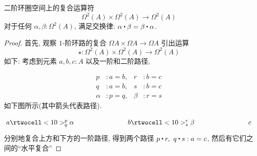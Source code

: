 \begin{thm}
    \label{thm:EckmannHilton}
    二阶环圈空间上的复合运算符
%
    \begin{equation*}
        \Omega^2(A)\times \Omega^2(A)\to \Omega^2(A)
    \end{equation*}
    对于任何 $\alpha, \beta:\Omega^2(A)$, 满足交换律: $\alpha\ct\beta = \beta\ct\alpha$.
\end{thm}

\begin{proof}
    首先, 观察 $1$-阶环路的复合 $\Omega A\times \Omega A\to \Omega A$ 引出运算
    \[
        \star : \Omega^2(A)\times \Omega^2(A)\to \Omega^2(A)
    \]
    如下: 考虑到元素 $a, b, c : A$ 以及一阶和二阶路径, %

    \begin{align*}
        p &: a = b, &r &: b = c \\
        q &: a = b, &s &: b = c \\
        \alpha &: p = q, &\beta &: r = s
    \end{align*}
%
    如下图所示(其中箭头代表路径). %

    \[
        \xymatrix@+5em{
                {a} \rtwocell<10>^p_q{\alpha}
            &
                {b} \rtwocell<10>^r_s{\beta}
            &
                {c}
        }
    \]
    分别地复合上方和下方的一阶路径, 得到两个路径 $p\ct r,\ q\ct s : a = c$, 然后有它们之间的``水平复合'' %


\end{proof}
